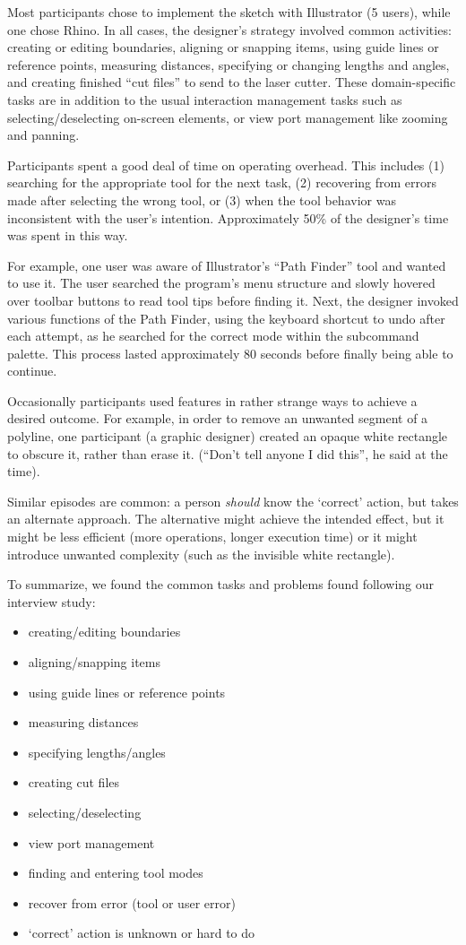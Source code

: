 \documentclass{article}
\begin{document}
Most participants chose to implement the sketch with Illustrator (5
users), while one chose Rhino. In all cases, the designer's strategy
involved common activities: creating or editing boundaries, aligning
or snapping items, using guide lines or reference points, measuring
distances, specifying or changing lengths and angles, and creating
finished ``cut files'' to send to the laser cutter. These
domain-specific tasks are in addition to the usual interaction
management tasks such as selecting/deselecting on-screen elements, or
view port management like zooming and panning.

Participants spent a good deal of time on operating overhead. This
includes (1) searching for the appropriate tool for the next task, (2)
recovering from errors made after selecting the wrong tool, or (3)
when the tool behavior was inconsistent with the user's
intention. Approximately 50\% of the designer's time was spent in this
way.

For example, one user was aware of Illustrator's ``Path Finder'' tool
and wanted to use it. The user searched the program's menu structure
and slowly hovered over toolbar buttons to read tool tips before
finding it. Next, the designer invoked various functions of the Path
Finder, using the keyboard shortcut to undo after each attempt, as he
searched for the correct mode within the subcommand palette. This
process lasted approximately 80 seconds before finally being able to
continue.

Occasionally participants used features in rather strange ways to
achieve a desired outcome. For example, in order to remove an unwanted
segment of a polyline, one participant (a graphic designer) created an
opaque white rectangle to obscure it, rather than erase it. (``Don't
tell anyone I did this'', he said at the time).

Similar episodes are common: a person \textit{should} know the
`correct' action, but takes an alternate approach. The alternative
might achieve the intended effect, but it might be less efficient
(more operations, longer execution time) or it might introduce
unwanted complexity (such as the invisible white rectangle).

To summarize, we found the common tasks and problems found following
our interview study:

\begin{itemize}
\item creating/editing boundaries
\item aligning/snapping items
\item using guide lines or reference points
\item measuring distances
\item specifying lengths/angles
\item creating cut files
\item selecting/deselecting
\item view port management
\item finding and entering tool modes
\item recover from error (tool or user error)
\item `correct' action is unknown or hard to do
\end{itemize}
\end{document}
